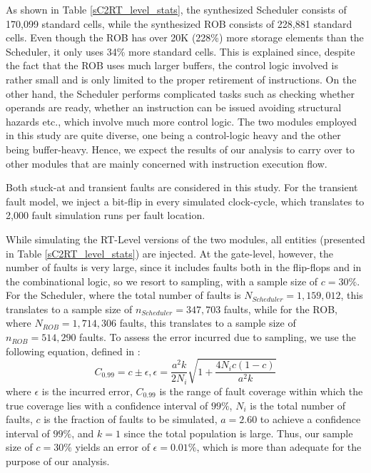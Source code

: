 \documentclass[12pt]{yalephd}
\begin{document}
As shown in Table \ref{sC2RT_level_stats}, the synthesized Scheduler consists of 170,099 standard cells, while the synthesized ROB consists of 228,881 standard cells. Even though the ROB has over 20K (228\%) more storage elements than the Scheduler, it only uses 34\% more standard cells. This is explained since, despite the fact that the ROB uses much larger buffers, the control logic involved is rather small and is only limited to the proper retirement of instructions. On the other hand, the Scheduler performs complicated tasks such as checking whether operands are ready, whether an instruction can be issued avoiding structural hazards etc., which involve much more control logic. The two modules employed in this study are quite diverse, one being a control-logic heavy and the other being buffer-heavy. Hence, we expect the results of our analysis to carry over to other modules that are mainly concerned with instruction execution flow.

 Both stuck-at and transient faults are considered in this study. For the transient fault model, we inject a bit-flip in every simulated clock-cycle, which translates to 2,000 fault simulation runs per fault location.

While simulating the RT-Level versions of the two modules, all entities (presented in Table \ref{sC2RT_level_stats}) are injected. At the gate-level, however, the number of faults is very large, since it includes faults both in the flip-flops and in the combinational logic, so we resort to sampling, with a sample size of $c=30\%$. For the Scheduler, where the total number of faults is $N_{Scheduler}=1,159,012$, this translates to a sample size of $n_{Scheduler}=347,703$ faults, while for the ROB, where  $N_{ROB}=1,714,306$ faults, this translates to a sample size of $n_{ROB}=514,290$ faults. To assess the error incurred due to sampling, we use the following equation, defined in \cite{Ag90}:
\begin{equation}
\label{eq}
C_{0.99} = c \pm \epsilon, \epsilon=\frac{a^2k}{2N_i}\sqrt{1+\frac{4N_ic(1-c)}{a^2k}}
\end{equation}
\noindent where $\epsilon$ is the incurred error, $C_{0.99}$ is the range of fault coverage within which the true coverage lies with a confidence interval of $99\%$, $N_i$ is the total number of faults, $c$ is the fraction of faults to be simulated, $a=2.60$ to achieve a confidence interval of $99\%$, and $k=1$ since the total population is large. Thus, our sample size of $c=30\%$ yields an error of $\epsilon=0.01\%$, which is more than adequate for the purpose of our analysis.
\end{document}

